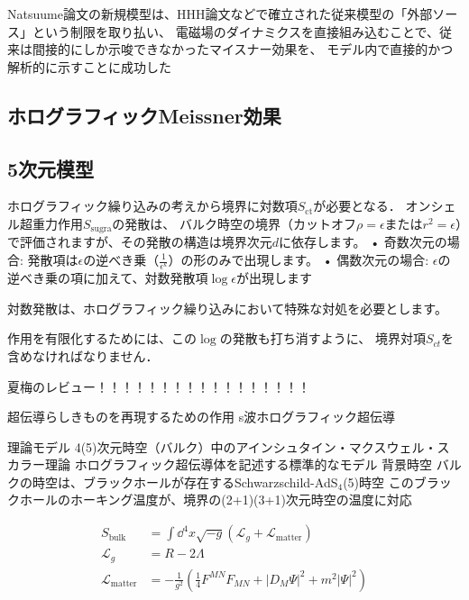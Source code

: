 \documentclass[b5paper,11pt,dvipdfmx]{jsarticle}
\numberwithin{equation}{section}
\theoremstyle{definition}
\begin{document}
Natsuume論文の新規模型は、HHH論文などで確立された従来模型の「外部ソース」という制限を取り払い、
電磁場のダイナミクスを直接組み込むことで、従来は間接的にしか示唆できなかったマイスナー効果を、
モデル内で直接的かつ解析的に示すことに成功した

\subsection{ホログラフィックMeissner効果}




\subsection{5次元模型}

ホログラフィック繰り込みの考えから境界に対数項$S_{\text{ct}}$が必要となる．
オンシェル超重力作用$S_{\text{sugra}}$の発散は、
バルク時空の境界（カットオフ$\rho = \epsilon$または$r^2 = \epsilon$）で評価されますが、その発散の構造は境界次元$d$に依存します。
• 奇数次元の場合: 発散項は$\epsilon$の逆べき乗（$\frac{1}{\epsilon^k}$）の形のみで出現します。
• 偶数次元の場合: $\epsilon$の逆べき乗の項に加えて、対数発散項$\log \epsilon$が出現します


対数発散は、ホログラフィック繰り込みにおいて特殊な対処を必要とします。

作用を有限化するためには、この$\log$の発散も打ち消すように、
境界対項$S_{ct}$を含めなければなりません\cite{deHaro00}．






夏梅のレビュー！！！！！！！！！！！！！！！！！

超伝導らしきものを再現するための作用
s波ホログラフィック超伝導

理論モデル
4(5)次元時空（バルク）中のアインシュタイン・マクスウェル・スカラー理論
ホログラフィック超伝導体を記述する標準的なモデル
背景時空
バルクの時空は、ブラックホールが存在するSchwarzschild-AdS$_4$(5)時空
このブラックホールのホーキング温度が、境界の(2+1)(3+1)次元時空の温度に対応

\begin{equation}
    \begin{split}
        S_{\text{bulk}}
        &= \int \dd^4 x \sqrt{-g} \left( \mathcal{L}_g + \mathcal{L}_{\text{matter}} \right)\\
        \mathcal{L}_{g}
        &= R - 2 \Lambda\\
        \mathcal{L}_{\text{matter}}
        &= - \frac{1}{g^2} \left( \frac{1}{4} F^{MN} F_{MN} + |D_M \Psi|^2 + m^2 |\Psi|^2 \right)
    \end{split}
\end{equation}
\end{document}

